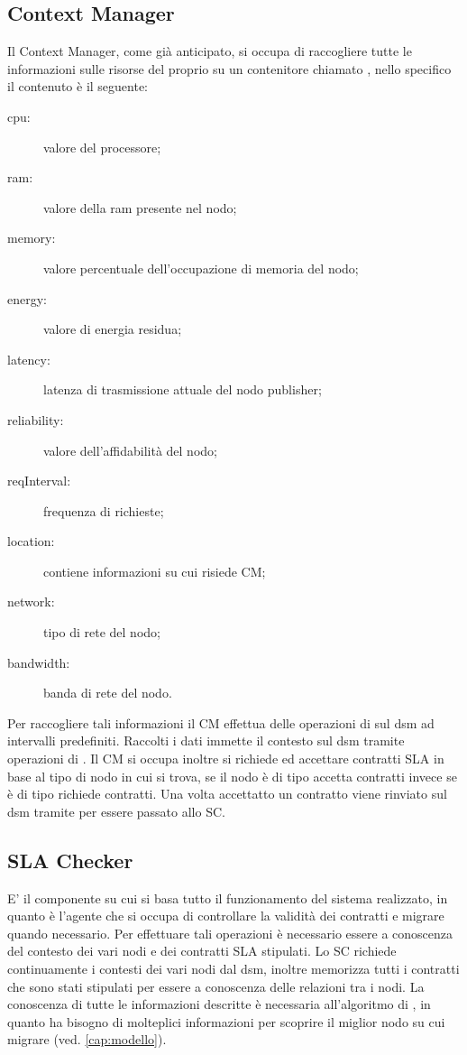 \subsection{Context Manager}
Il Context Manager, come già anticipato, si occupa di raccogliere tutte le informazioni sulle risorse del proprio su un contenitore chiamato , nello specifico il contenuto è il seguente:
\begin{description}
	\item[cpu:] valore del processore;
	\item[ram:] valore della ram presente nel nodo;
	\item[memory:] valore percentuale dell'occupazione di memoria del nodo;
	\item[energy:] valore di energia residua;
	\item[latency:] latenza di trasmissione attuale del nodo publisher;
	\item[reliability:] valore dell'affidabilità del nodo;
	\item[reqInterval:] frequenza di richieste;
	\item[location:] contiene informazioni su cui risiede CM;
	\item[network:] tipo di rete del nodo;
	\item[bandwidth:] banda di rete del nodo.
\end{description}
Per raccogliere tali informazioni il CM effettua delle operazioni di  sul dsm ad intervalli predefiniti. Raccolti i dati immette il contesto sul dsm tramite operazioni di . Il CM si occupa inoltre si richiede ed accettare contratti SLA in base al tipo di nodo in cui si trova, se il nodo è di tipo  accetta contratti invece se è di tipo  richiede contratti. Una volta accettatto un contratto viene rinviato sul dsm tramite  per essere passato allo SC.
\subsection{SLA Checker}
E' il componente su cui si basa tutto il funzionamento del sistema realizzato, in quanto è l'agente che si occupa di controllare la validità dei contratti e migrare quando necessario. Per effettuare tali operazioni è necessario essere a conoscenza del contesto dei vari nodi e dei contratti SLA stipulati. Lo SC richiede continuamente i contesti dei vari nodi dal dsm, inoltre memorizza tutti i contratti che sono stati stipulati per essere a conoscenza delle relazioni tra i nodi. La conoscenza di tutte le informazioni descritte è necessaria all'algoritmo di , in quanto ha bisogno di molteplici informazioni per scoprire il miglior nodo su cui migrare (ved. \ref{cap:modello}).
